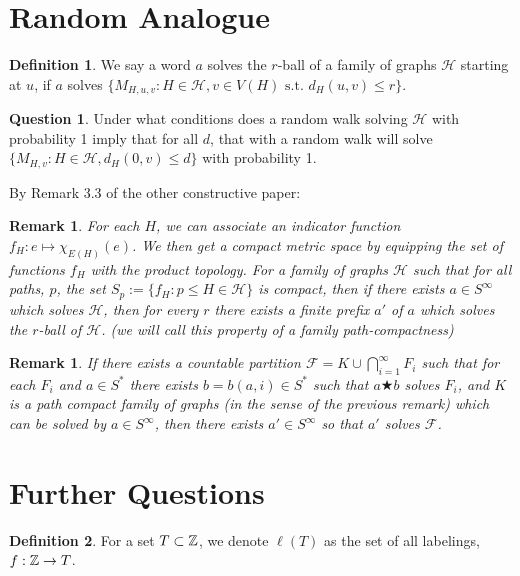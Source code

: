 \documentclass[a4paper]{article}
\newtheorem{rmk}[result]{Remark}
\theoremstyle{definition}
\newtheorem*{defn}{Definition}
\newtheorem*{que}{Question}
\begin{document}
\section{Random Analogue}

\begin{defn}
    We say a word $a$ solves the $r$-ball of a family of graphs $\mathcal{H}$ starting at $u$, if $a$ solves $\{M_{H,u,v}: H\in \mathcal{H}, v\in V(H) \textrm{ s.t. } d_H(u,v)\le r\}$. 
\end{defn}

\begin{que}
    Under what conditions does a random walk solving $\mathcal{H}$ with probability 1 imply that for all $d$, that with a random walk will solve $\{M_{H,v}: H\in\mathcal{H},d_H(0,v) \le d\}$ with probability 1.
\end{que}
By Remark 3.3 of the other constructive paper:
\begin{rmk}
    For each $H$, we can associate an indicator function $f_H:e\mapsto \chi_{E(H)}(e)$. We then get a compact metric space by equipping the set of functions $f_H$ with the product topology. For a family of graphs $\mathcal{H}$ such that for all paths, $p$, the set $S_p:=\{f_H:p\le H \in \mathcal{H}\}$ is compact, then if there exists $a \in S^\infty$ which solves $\mathcal{H}$, then for every $r$ there exists a finite prefix $a'$ of $a$ which solves the $r$-ball of $\mathcal{H}$. (we will call this property of a family path-compactness)
\end{rmk}

\begin{rmk} If there exists a countable partition $\mathcal{F} = K \cup \bigcap_{i=1}^\infty F_i$ such that for each $F_i$ and $a \in S^*$ there exists $b= b(a,i) \in S^*$ such that $a\bigstar b$ solves $F_i$, and $K$ is a path compact family of graphs (in the sense of the previous remark) which can be solved by $a \in S^\infty$, then there exists $a' \in S^\infty$ so that $a'$ solves $\mathcal{F}$.
\end{rmk}

\section{Further Questions}

\begin{defn}
    For a set $T \subset \Bbb{Z}$, we denote $\ell(T)$ as the set of all labelings, $f:\Bbb{Z}\to T$. 
\end{defn}
\end{document}
